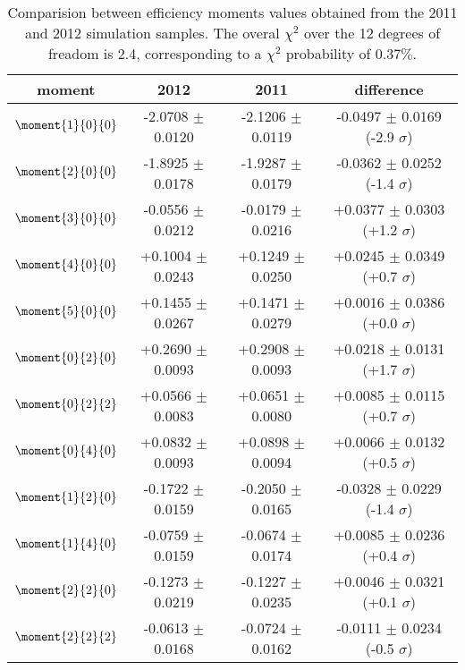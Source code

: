 \begin{table}
\centering
\footnotesize
\begin{tabular}{c c c c}
  \hline
        moment         &  2012    &    2011  &   difference                        \\
  \hline
  $\moment{1}{0}{0}$   & -2.0708 $\pm$  0.0120  &  -2.1206 $\pm$  0.0119  &  -0.0497 $\pm$  0.0169 (-2.9 $\sigma$) \\
  $\moment{2}{0}{0}$   & -1.8925 $\pm$  0.0178  &  -1.9287 $\pm$  0.0179  &  -0.0362 $\pm$  0.0252 (-1.4 $\sigma$) \\
  $\moment{3}{0}{0}$   & -0.0556 $\pm$  0.0212  &  -0.0179 $\pm$  0.0216  &  +0.0377 $\pm$  0.0303 (+1.2 $\sigma$) \\
  $\moment{4}{0}{0}$   & +0.1004 $\pm$  0.0243  &  +0.1249 $\pm$  0.0250  &  +0.0245 $\pm$  0.0349 (+0.7 $\sigma$) \\
  $\moment{5}{0}{0}$   & +0.1455 $\pm$  0.0267  &  +0.1471 $\pm$  0.0279  &  +0.0016 $\pm$  0.0386 (+0.0 $\sigma$) \\
  $\moment{0}{2}{0}$   & +0.2690 $\pm$  0.0093  &  +0.2908 $\pm$  0.0093  &  +0.0218 $\pm$  0.0131 (+1.7 $\sigma$) \\
  $\moment{0}{2}{2}$   & +0.0566 $\pm$  0.0083  &  +0.0651 $\pm$  0.0080  &  +0.0085 $\pm$  0.0115 (+0.7 $\sigma$) \\
  $\moment{0}{4}{0}$   & +0.0832 $\pm$  0.0093  &  +0.0898 $\pm$  0.0094  &  +0.0066 $\pm$  0.0132 (+0.5 $\sigma$) \\
  $\moment{1}{2}{0}$   & -0.1722 $\pm$  0.0159  &  -0.2050 $\pm$  0.0165  &  -0.0328 $\pm$  0.0229 (-1.4 $\sigma$) \\
  $\moment{1}{4}{0}$   & -0.0759 $\pm$  0.0159  &  -0.0674 $\pm$  0.0174  &  +0.0085 $\pm$  0.0236 (+0.4 $\sigma$) \\
  $\moment{2}{2}{0}$   & -0.1273 $\pm$  0.0219  &  -0.1227 $\pm$  0.0235  &  +0.0046 $\pm$  0.0321 (+0.1 $\sigma$) \\
  $\moment{2}{2}{2}$   & -0.0613 $\pm$  0.0168  &  -0.0724 $\pm$  0.0162  &  -0.0111 $\pm$  0.0234 (-0.5 $\sigma$) \\
  \hline
\end{tabular}
\caption{Comparision between efficiency moments values obtained from the 2011 and 2012 \BsJpsiKst simulation samples.
         The overal $\chi^2$ over the 12 degrees of freadom is 2.4, corresponding to a $\chi^2$ probability of $0.37\%$.}
\label{moms_comp_periods_neg} 
\end{table}

